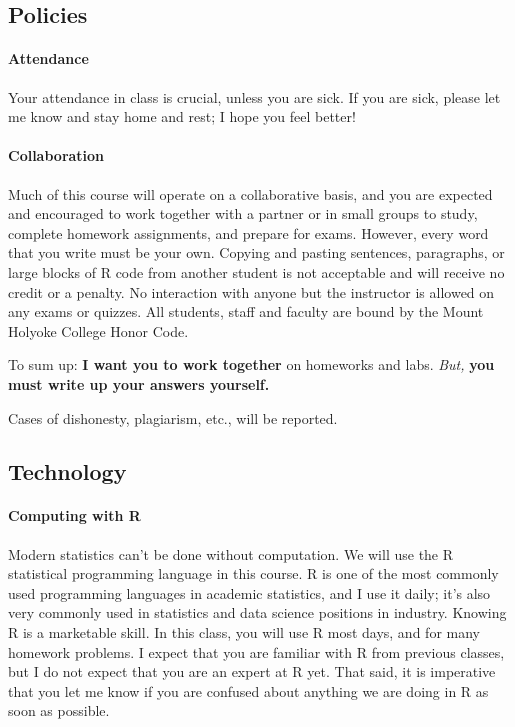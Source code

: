 \documentclass[11pt]{article}
\begin{document}
\newpage

\subsection*{Policies}

\paragraph{Attendance}

Your attendance in class is crucial, unless you are sick.  If you are sick, please let me know and stay home and rest; I hope you feel better!

\paragraph{Collaboration}

Much of this course will operate on a collaborative basis, and you are expected and encouraged to work together with a partner or in small groups to study, complete homework assignments, and prepare for exams. However, every word that you write must be your own.  Copying and pasting sentences, paragraphs, or large blocks of R code from another student is not acceptable and will receive no credit or a penalty.  No interaction with anyone but the instructor is allowed on any exams or quizzes.  All students, staff and faculty are bound by the Mount Holyoke College Honor Code.

To sum up: \textbf{I want you to work together} on homeworks and labs.  \emph{But,} \textbf{you must write up your answers yourself.}

Cases of dishonesty, plagiarism, etc., will be reported.

\subsection*{Technology}

\paragraph{Computing with R}

Modern statistics can't be done without computation.  We will use the R statistical programming language in this course.  R is one of the most commonly used programming languages in academic statistics, and I use it daily; it's also very commonly used in statistics and data science positions in industry.  Knowing R is a marketable skill.  In this class, you will use R most days, and for many homework problems.  I expect that you are familiar with R from previous classes, but I do not expect that you are an expert at R yet.  That said, it is imperative that you let me know if you are confused about anything we are doing in R as soon as possible.
\end{document}
